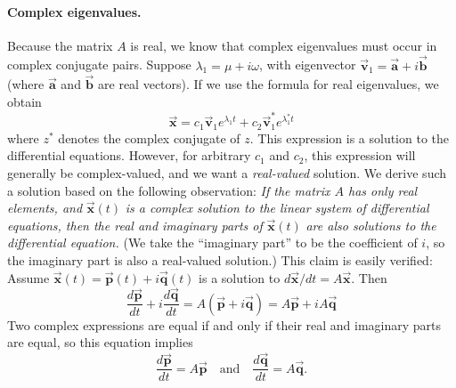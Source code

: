 \documentclass{book}
\newcommand{\BA}{\vec{\textbf{a}}}
\newcommand{\BB}{\vec{\textbf{b}}}
\newcommand{\BP}{\vec{\textbf{p}}}
\newcommand{\BQ}{\vec{\textbf{q}}}
\newcommand{\BV}{\vec{\textbf{v}}}
\newcommand{\BX}{\vec{\textbf{x}}}
\begin{document}
\paragraph{Complex eigenvalues.}
Because the matrix $A$ is real, we know that complex eigenvalues must
occur in complex conjugate pairs.
Suppose $\lambda_1 = \mu + i\omega$, with eigenvector
$\BV_1=\BA+i\BB$ (where $\BA$ and $\BB$ are real vectors).
If we use the formula for real eigenvalues,
we obtain
\begin{equation}
 \BX = c_1 \BV_1 e^{\lambda_1 t} + c_2 \BV_1^* e^{\lambda_1^* t} 
\end{equation}
where $z^*$ denotes the complex conjugate of $z$.
This expression is a solution to the differential equations.
However, for arbitrary $c_1$ and $c_2$, this expression will
generally be complex-valued, and we want a \emph{real-valued}
solution.
We derive such a solution based on the following observation:
\emph{If the matrix $A$ has only real elements, and} $\BX(t)$
\emph{is a complex solution to the linear system of differential equations,
then the real and imaginary parts of} $\BX(t)$
\emph{are also solutions
to the differential equation.}  (We take the ``imaginary part''
to be the coefficient of $i$, so the imaginary part is also
a real-valued solution.)  This claim is easily verified:
Assume $\BX(t) = \BP(t) + i \BQ(t)$ is a solution to
$d\BX/dt = A\BX$.  Then
\begin{equation}
  \frac{d\BP}{dt} + i\frac{d\BQ}{dt} = A(\BP+i\BQ) = A\BP + iA\BQ
\end{equation}
Two complex expressions are equal if and only if their real
and imaginary parts are equal, so this equation implies
\begin{equation}
  \frac{d\BP}{dt} = A\BP \quad \textrm{and} \quad
  \frac{d\BQ}{dt} = A\BQ.
\end{equation}
\end{document}
